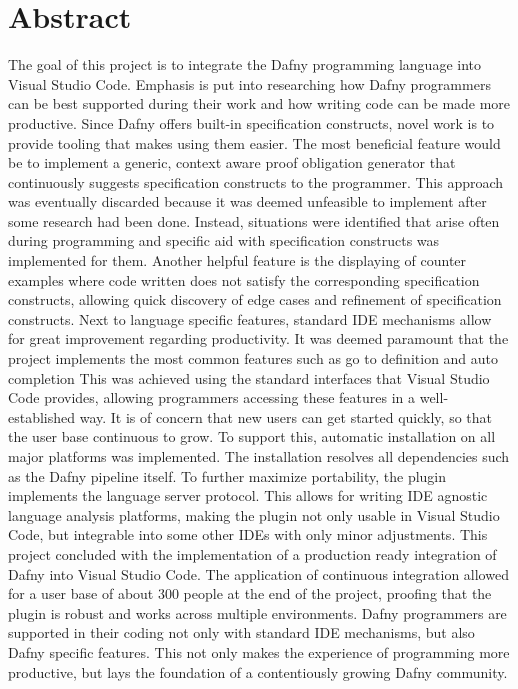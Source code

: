 \section{Abstract}
The goal of this project is to integrate the Dafny programming language into Visual Studio Code. Emphasis is put into researching how Dafny programmers can be best supported during their work and how writing code can be made more productive.\newline 
Since Dafny offers built-in specification constructs, novel work is to provide tooling that makes using them easier. The most beneficial feature would be to implement a generic, context aware proof obligation generator that continuously suggests specification constructs to the programmer. This approach was eventually discarded because it was deemed unfeasible to implement after some research had been done. Instead, situations were identified that arise often during programming and specific aid with specification constructs was implemented for them. Another helpful feature is the displaying of counter examples where code written does not satisfy the corresponding specification constructs, allowing quick discovery of edge cases and refinement of specification constructs.\newline 
Next to language specific features, standard IDE mechanisms allow for great improvement regarding productivity. It was deemed paramount that the project implements the most common features such as go to definition and auto completion This was achieved using the standard interfaces that Visual Studio Code provides, allowing programmers accessing these features in a well-established way.\newline
It is of concern that new users can get started quickly, so that the user base continuous to grow. To support this, automatic installation on all major platforms was implemented. The installation resolves all dependencies such as the Dafny pipeline itself. To further maximize portability, the plugin implements the language server protocol. This allows for writing IDE agnostic language analysis platforms, making the plugin not only usable in Visual Studio Code, but integrable into some other IDEs with only minor adjustments.\newline
This project concluded with the implementation of a production ready integration of Dafny into Visual Studio Code. The application of continuous integration allowed for a user base of about 300 people at the end of the project, proofing that the plugin is robust and works across multiple environments. Dafny programmers are supported in their coding not only with standard IDE mechanisms, but also Dafny specific features. This not only makes the experience of programming more productive, but lays the foundation of a contentiously growing Dafny community.\newline
